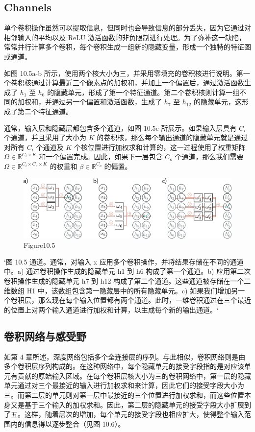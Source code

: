 \subsection{Channels}
单个卷积操作虽然可以提取信息，但同时也会导致信息的部分丢失，因为它通过对相邻输入的平均以及 ReLU 激活函数的非负限制进行处理。为了弥补这一缺陷，常常并行计算多个卷积，每个卷积生成一组新的隐藏变量，形成一个独特的特征图或通道。

如图 10.5a-b 所示，使用两个核大小为三，并采用零填充的卷积核进行说明。第一个卷积核通过计算最近三个像素点的加权和，并加上一个偏置后，通过激活函数生成了 \(h_1\) 至 \(h_6\) 的隐藏单元，形成了第一个特征通道。第二个卷积核则计算一组不同的加权和，并通过另一个偏置和激活函数，生成了 \(h_7\) 至 \(h_{12}\) 的隐藏单元，这形成了第二个特征通道。

通常，输入层和隐藏层都包含多个通道，如图 10.5c 所展示。如果输入层具有 \(C_i\) 个通道，并且采用了大小为 \(K\) 的卷积核，那么每个输出通道的隐藏单元就是通过对所有 \(C_i\) 个通道及 \(K\) 个核位置进行加权求和计算的，这一过程使用了权重矩阵 \(\Omega \in \mathbb{R}^{C_i \times K}\) 和一个偏置完成。因此，如果下一层包含 \(C_o\) 个通道，那么我们需要 \(\Omega \in \mathbb{R}^{C_i \times C_o \times K}\) 的权重和 \(\beta \in \mathbb{R}^{C_o}\) 的偏置。


\begin{figure}[h!]
\centering
\includegraphics[width=0.7\linewidth]{png/chapter10/Conv4a.png}
\caption{Figure10.5}
\end{figure}

`图 10.5 通道。通常，对输入 x 应用多个卷积操作，并将结果存储在不同的通道中。a) 通过卷积操作生成的隐藏单元 h1 到 h6 构成了第一个通道。b) 应用第二次卷积操作生成的隐藏单元 h7 到 h12 构成了第二个通道。这些通道被存储在一个二维数组 H1 中，该数组包含第一隐藏层中的所有隐藏单元。c) 如果我们增加另一个卷积层，那么现在每个输入位置都有两个通道。此时，一维卷积通过在三个最近的位置上对两个输入通道进行加权和计算，以生成每个新的输出通道。`

\subsection{卷积网络与感受野}
如第 4 章所述，深度网络包括多个全连接层的序列。与此相似，卷积网络则是由多个卷积层序列构成的。在这种网络中，每个隐藏单元的接受字段指的是对应该单元有贡献的原始输入区域。在每个卷积层核大小为三的卷积网络中，第一层的隐藏单元通过对三个最接近的输入进行加权求和来计算，因此它们的接受字段大小为三。而第二层的单元则对第一层中最接近的三个位置进行加权求和，而这些位置本身又是基于三个输入的加权求和。因此，第二层的隐藏单元的接受字段大小扩展到了五。这样，随着层次的增加，每个单元的接受字段也相应扩大，使得整个输入范围内的信息得以逐步整合（见图 10.6）。



